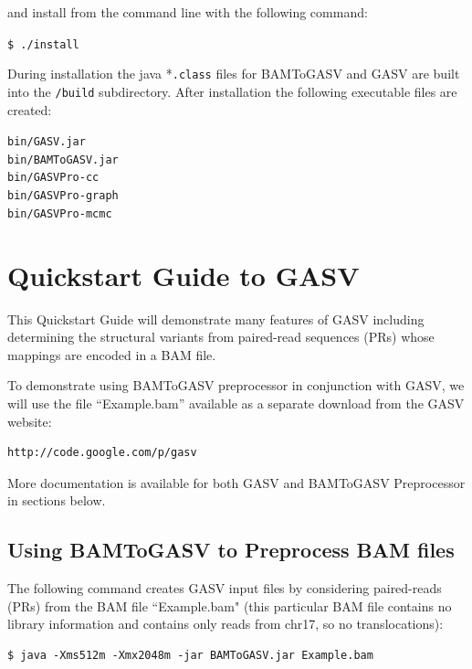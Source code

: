 \documentclass[11pt]{article}
\begin{document}
\noindent and install from the command line with the following command:

\begin{framed}
{\normalsize
\noindent \texttt{\$ ./install}
}
\end{framed}

\noindent During installation the java *\verb+.class+ files for BAMToGASV and GASV are built into the \verb+/build+ subdirectory. After installation the following executable files are created:
	
\begin{framed}
{\normalsize
\noindent \texttt{bin/GASV.jar }\\
\noindent \texttt{bin/BAMToGASV.jar }\\
\noindent \texttt{bin/GASVPro-cc}\\
\noindent \texttt{bin/GASVPro-graph}\\
\noindent \texttt{bin/GASVPro-mcmc}
}
\end{framed}


\section{Quickstart Guide to GASV}

This Quickstart Guide will demonstrate many features of GASV including determining the 
structural variants from paired-read sequences (PRs) whose mappings 
are encoded in a BAM file.

To demonstrate using BAMToGASV preprocessor in conjunction with GASV, we will use the file ``Example.bam'' available as a separate download from the GASV website:

\begin{Verbatim}[frame=single]
http://code.google.com/p/gasv
\end{Verbatim}

More documentation is available for both GASV and BAMToGASV Preprocessor 
in sections below.  

\subsection{Using BAMToGASV to Preprocess BAM files}

The following command creates GASV input files by considering paired-reads (PRs) 
from the BAM file ``Example.bam" (this particular BAM file contains no library information and contains only reads from chr17, so no translocations):
{\normalsize
\begin{Verbatim}[frame=single]
$ java -Xms512m -Xmx2048m -jar BAMToGASV.jar Example.bam
\end{Verbatim}
}
\end{document}
